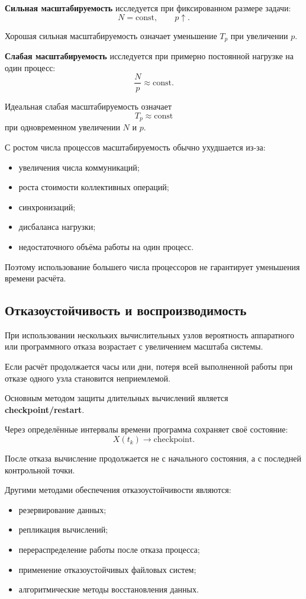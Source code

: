 \textbf{Сильная масштабируемость} исследуется при фиксированном размере задачи:
\[
N=\mathrm{const}, \qquad p\uparrow.
\]

Хорошая сильная масштабируемость означает уменьшение $T_p$ при увеличении $p$.

\textbf{Слабая масштабируемость} исследуется при примерно постоянной нагрузке
на один процесс:
\[
\frac{N}{p}\approx\mathrm{const}.
\]

Идеальная слабая масштабируемость означает
\[
T_p \approx \mathrm{const}
\]
при одновременном увеличении $N$ и $p$.

С ростом числа процессов масштабируемость обычно ухудшается из-за:
\begin{itemize}
	\item увеличения числа коммуникаций;
	\item роста стоимости коллективных операций;
	\item синхронизаций;
	\item дисбаланса нагрузки;
	\item недостаточного объёма работы на один процесс.
\end{itemize}

Поэтому использование большего числа процессоров не гарантирует уменьшения
времени расчёта.

\subsection{Отказоустойчивость и воспроизводимость}

При использовании нескольких вычислительных узлов вероятность аппаратного
или программного отказа возрастает с увеличением масштаба системы.

Если расчёт продолжается часы или дни, потеря всей выполненной работы при отказе
одного узла становится неприемлемой.

Основным методом защиты длительных вычислений является
\textbf{checkpoint/restart}.

Через определённые интервалы времени программа сохраняет своё состояние:
\[
X(t_k)\longrightarrow\text{checkpoint}.
\]

После отказа вычисление продолжается не с начального состояния, а с последней
контрольной точки.

Другими методами обеспечения отказоустойчивости являются:
\begin{itemize}
	\item резервирование данных;
	\item репликация вычислений;
	\item перераспределение работы после отказа процесса;
	\item применение отказоустойчивых файловых систем;
	\item алгоритмические методы восстановления данных.
\end{itemize}

